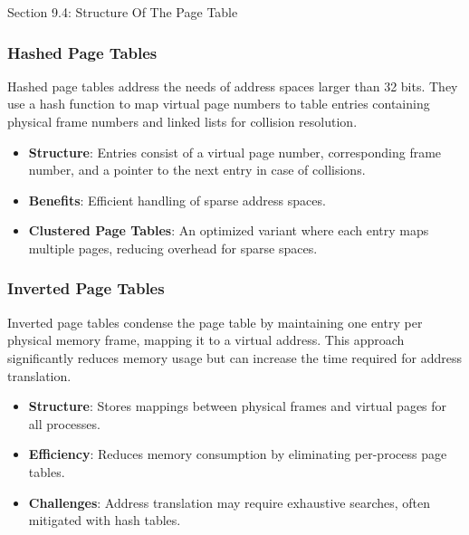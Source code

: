 \begin{notes}{Section 9.4: Structure Of The Page Table}
\begin{highlight}
    \end{highlight}

    \subsubsection*{Hashed Page Tables}

    Hashed page tables address the needs of address spaces larger than 32 bits. They use a hash function to map virtual page numbers to table entries containing physical frame numbers and linked 
    lists for collision resolution.

    \begin{highlight}

        \begin{itemize}
            \item \textbf{Structure}: Entries consist of a virtual page number, corresponding frame number, and a pointer to the next entry in case of collisions.
            \item \textbf{Benefits}: Efficient handling of sparse address spaces.
            \item \textbf{Clustered Page Tables}: An optimized variant where each entry maps multiple pages, reducing overhead for sparse spaces.
        \end{itemize}

    \end{highlight}

    \subsubsection*{Inverted Page Tables}

    Inverted page tables condense the page table by maintaining one entry per physical memory frame, mapping it to a virtual address. This approach significantly reduces memory usage but can increase 
    the time required for address translation.

    \begin{highlight}

        \begin{itemize}
            \item \textbf{Structure}: Stores mappings between physical frames and virtual pages for all processes.
            \item \textbf{Efficiency}: Reduces memory consumption by eliminating per-process page tables.
            \item \textbf{Challenges}: Address translation may require exhaustive searches, often mitigated with hash tables.
        \end{itemize}


\end{highlight}
\end{notes}

